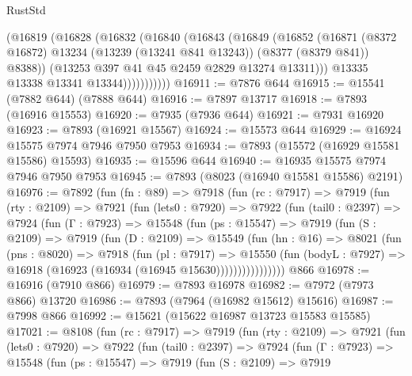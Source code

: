 \begin{lexlean}{RustStd}
\begin{coremodule}
                  (@16819
                    (@16828
                      (@16832
                        (@16840
                          (@16843
                            (@16849
                              (@16852
                                (@16871
                                  (@8372 @16872)
                                  @13234
                                  (@13239 (@13241 @841 @13243))
                                  (@8377 (@8379 @841))
                                  @8388))
                              (@13253 @397 @41 @45 @2459 @2829 @13274 @13311)))
                          @13335
                          @13338
                          @13341
                          @13344)))))))))))
@16911 := @7876 @644
@16915 := @15541 (@7882 @644) (@7888 @644)
@16916 := @7897 @13717
@16918 := @7893 (@16916 @15553)
@16920 := @7935 (@7936 @644)
@16921 := @7931 @16920
@16923 := @7893 (@16921 @15567)
@16924 := @15573 @644
@16929 := @16924 @15575 @7974 @7946 @7950 @7953
@16934 := @7893 (@15572 (@16929 @15581 @15586) @15593)
@16935 := @15596 @644
@16940 := @16935 @15575 @7974 @7946 @7950 @7953
@16945 := @7893 (@8023 (@16940 @15581 @15586) @2191)
@16976 := @7892
    (fun (fn : @89) =>
    @7918
      (fun (rc : @7917) =>
      @7919
        (fun (rty : @2109) =>
        @7921
          (fun (lets0 : @7920) =>
          @7922
            (fun (tail0 : @2397) =>
            @7924
              (fun (Γ : @7923) =>
              @15548
                (fun (ps : @15547) =>
                @7919
                  (fun (S : @2109) =>
                  @7919
                    (fun (D : @2109) =>
                    @15549
                      (fun (hn : @16) =>
                      @8021
                        (fun (pns : @8020) =>
                        @7918
                          (fun (pl : @7917) =>
                          @15550
                            (fun (bodyL : @7927) =>
                            @16918 (@16923 (@16934 (@16945 @15630))))))))))))))))
    @866
@16978 := @16916 (@7910 @866)
@16979 := @7893 @16978
@16982 := @7972 (@7973 @866) @13720
@16986 := @7893 (@7964 (@16982 @15612) @15616)
@16987 := @7998 @866
@16992 := @15621 (@15622 @16987 @13723 @15583 @15585)
@17021 := @8108
    (fun (rc : @7917) =>
    @7919
      (fun (rty : @2109) =>
      @7921
        (fun (lets0 : @7920) =>
        @7922
          (fun (tail0 : @2397) =>
          @7924
            (fun (Γ : @7923) =>
            @15548
              (fun (ps : @15547) =>
              @7919
                (fun (S : @2109) =>
                @7919

\end{coremodule}
\end{lexlean}
